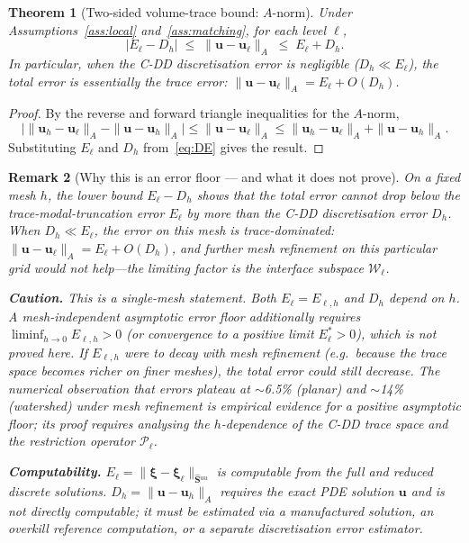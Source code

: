 \documentclass[11pt,a4paper]{article}
\newtheorem{theorem}{Theorem}[section]
\newtheorem{remark}[theorem]{Remark}
\theoremstyle{definition}
\newcommand{\vel}{\bm{u}}
\newcommand{\Schur}{\mathbf{S}}
\newcommand{\Shatuu}{\widehat{\Schur}{}^{uu}}
\newcommand{\Wspace}{\mathcal{W}}
\newcommand{\Pcal}{\mathcal{P}}
\begin{document}
\begin{theorem}[Two-sided volume-trace bound: $A$-norm]\label{thm:sep-A}
  Under Assumptions~\ref{ass:local} and~\ref{ass:matching},
  for each level $\ell$,
  \begin{equation}\label{eq:sep-A}
    |E_\ell - D_h|
    \;\le\; \|\vel - \vel_\ell\|_A
    \;\le\; E_\ell + D_h.
  \end{equation}
  In particular, when the C-DD discretisation error is negligible
  ($D_h \ll E_\ell$), the total error is essentially the trace error:
  $\|\vel - \vel_\ell\|_A = E_\ell + O(D_h)$.
\end{theorem}

\begin{proof}
  By the reverse and forward triangle inequalities for the $A$-norm,
  \[
    \bigl|\|\vel_h - \vel_\ell\|_A - \|\vel - \vel_h\|_A\bigr|
    \le \|\vel - \vel_\ell\|_A
    \le \|\vel_h - \vel_\ell\|_A + \|\vel - \vel_h\|_A.
  \]
  Substituting $E_\ell$ and $D_h$ from~\eqref{eq:DE} gives the result.
\end{proof}

\begin{remark}[Why this is an error floor --- and what it does not prove]\label{rem:floor}
  On a fixed mesh $h$, the lower bound $E_\ell - D_h$ shows that the
  total error cannot drop below the trace-modal-truncation error
  $E_\ell$ by more than the C-DD discretisation error $D_h$.
  When $D_h \ll E_\ell$, the error on this mesh is trace-dominated:
  $\|\vel-\vel_\ell\|_A = E_\ell + O(D_h)$, and further mesh refinement
  on this particular grid would not help---the limiting factor is the
  interface subspace $\Wspace_\ell$.

  \textbf{Caution.}  This is a \emph{single-mesh} statement.
  Both $E_\ell = E_{\ell,h}$ and $D_h$ depend on $h$.  A mesh-independent
  asymptotic error floor additionally requires
  $\liminf_{h\to 0} E_{\ell,h} > 0$ (or convergence to a positive
  limit $E_{\ell}^* > 0$), which is not proved here.  If $E_{\ell,h}$
  were to decay with mesh refinement (e.g.\ because the trace space
  becomes richer on finer meshes), the total error could still decrease.
  The numerical observation that errors plateau at $\sim$6.5\% (planar)
  and $\sim$14\% (watershed) under mesh refinement is empirical evidence
  for a positive asymptotic floor; its proof requires analysing the
  $h$-dependence of the C-DD trace space and the restriction operator
  $\Pcal_\ell$.

  \textbf{Computability.}  $E_\ell = \|\bm{\xi}-\bm{\xi}_\ell\|_{\Shatuu}$
  is computable from the full and reduced discrete solutions.
  $D_h = \|\vel-\vel_h\|_A$ requires the exact PDE solution $\vel$ and is
  \emph{not} directly computable; it must be estimated via a manufactured
  solution, an overkill reference computation, or a separate discretisation
  error estimator.
\end{remark}
\end{document}
